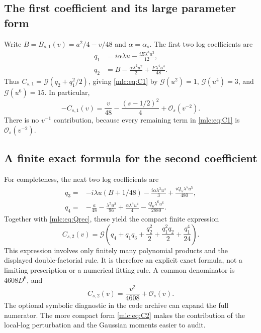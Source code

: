 \documentclass[11pt]{article}
\theoremstyle{remark}\newtheorem{remark}[theorem]{Remark}
\newcommand{\OO}{\mathcal O}
\newcommand{\G}{\mathcal G}
\begin{document}
\subsection{The first coefficient and its large parameter form}
Write $B=B_{s,1}(v)=a^2/4-v/48$ and $\alpha=\alpha_s$. The first two log coefficients are
\begin{align}
 q_1&=i\alpha\lambda u-\frac{iE\lambda^3u^3}{12},\label{mlc:eq:q1}\\
 q_2&=B-\frac{\alpha\lambda^2u^2}{2}
                        +\frac{F\lambda^4u^4}{48}.\label{mlc:eq:q2}
\end{align}
Thus $C_{s,1}=\G(q_2+q_1^2/2)$, giving \eqref{mlc:eq:C1} by $\G(u^2)=1$, $\G(u^4)=3$, and $\G(u^6)=15$. In particular,
\begin{equation}\label{mlc:eq:C1large}
 -C_{s,1}(v)=\frac v{48}-\frac{(s-1/2)^2}{4}+\OO_s(v^{-2}).
\end{equation}
There is no $v^{-1}$ contribution, because every remaining term in \eqref{mlc:eq:C1} is $\OO_s(v^{-2})$.

\subsection{A finite exact formula for the second coefficient}
For completeness, the next two log coefficients are
\begin{align}
 q_3={}&-i\lambda u(B+1/48)
       -\frac{i\alpha\lambda^3u^3}{3}
       +\frac{iQ_5\lambda^5u^5}{480},\label{mlc:eq:q3}\\
 q_4={}&-\frac a{48}-\frac{\lambda^2u^2}{96}
       +\frac{\alpha\lambda^4u^4}{4}
       -\frac{Q_6\lambda^6u^6}{2880}.\label{mlc:eq:q4}
\end{align}
Together with \eqref{mlc:eq:Qrec}, these yield the compact finite expression
\begin{equation}\label{mlc:eq:C2}
 C_{s,2}(v)=\G\left(q_4+q_1q_3+\frac{q_2^2}{2}
                       +\frac{q_1^2q_2}{2}+\frac{q_1^4}{24}\right).
\end{equation}
This expression involves only finitely many polynomial products and the displayed double-factorial rule. It is therefore an explicit exact formula, not a limiting prescription or a numerical fitting rule. A common denominator is $4608D^6$, and
\begin{equation}\label{mlc:eq:C2large}
 C_{s,2}(v)=\frac{v^2}{4608}+\OO_s(v).
\end{equation}
The optional symbolic diagnostic in the code archive can expand the full numerator. The more compact form \eqref{mlc:eq:C2} makes the contribution of the local-log perturbation and the Gaussian moments easier to audit.
\end{document}
